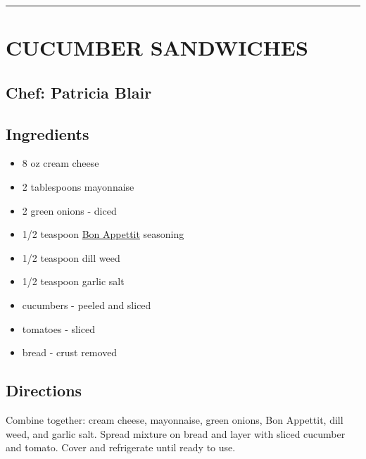 \documentclass[
]{book}
\providecommand{\tightlist}{%
  \setlength{\itemsep}{0pt}\setlength{\parskip}{0pt}}
\begin{document}
\begin{center}\rule{0.5\linewidth}{0.5pt}\end{center}

\hypertarget{cucumber-sandwiches}{%
\section*{CUCUMBER SANDWICHES}\label{cucumber-sandwiches}}

\hypertarget{chef-patricia-blair-1}{%
\subsection*{Chef: Patricia Blair}\label{chef-patricia-blair-1}}

\hypertarget{ingredients-3}{%
\subsection*{Ingredients}\label{ingredients-3}}

\begin{itemize}
\tightlist
\item
  8 oz cream cheese
\item
  2 tablespoons mayonnaise
\item
  2 green onions - diced
\item
  1/2 teaspoon \href{https://www.mccormick.com/gourmet/recipes/other/bon-appetit-seasoning-replacement}{Bon Appettit} seasoning
\item
  1/2 teaspoon dill weed
\item
  1/2 teaspoon garlic salt
\item
  cucumbers - peeled and sliced
\item
  tomatoes - sliced
\item
  bread - crust removed
\end{itemize}

\hypertarget{directions-3}{%
\subsection*{Directions}\label{directions-3}}

Combine together: cream cheese, mayonnaise, green onions, Bon Appettit, dill weed, and garlic salt.
Spread mixture on bread and layer with sliced cucumber and tomato. Cover and refrigerate until ready to use.
\end{document}
